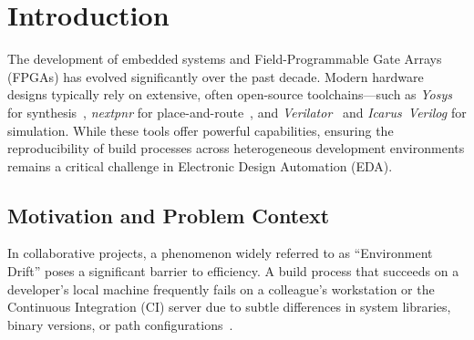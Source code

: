 % 
% 
% 

\chapter{Introduction}
\label{ch:introduction}

The development of embedded systems and Field-Programmable Gate Arrays (FPGAs) has evolved significantly over the past decade. Modern hardware designs typically rely on extensive, often open-source toolchains---such as \textit{Yosys} for synthesis~\cite{wolf2013yosys}, \textit{nextpnr} for place-and-route~\cite{shah2019nextpnr}, and \textit{Verilator}~\cite{snyder2004verilator} and \textit{Icarus~Verilog} for simulation. While these tools offer powerful capabilities, ensuring the reproducibility of build processes across heterogeneous development environments remains a critical challenge in Electronic Design Automation (EDA).

\section{Motivation and Problem Context}
In collaborative projects, a phenomenon widely referred to as ``Environment Drift'' poses a significant barrier to efficiency. A build process that succeeds on a developer's local machine frequently fails on a colleague's workstation or the Continuous Integration (CI) server due to subtle differences in system libraries, binary versions, or path configurations~\cite{courtes2013functional}.

